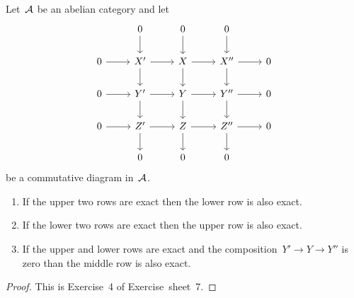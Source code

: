 \begin{lemma}[9-Lemma]
  \label{9 lemma}
  Let~$\mathcal{A}$ be an abelian category and let
  \[
    \begin{tikzcd}
        {}
      & 0
        \arrow{d}
      & 0
        \arrow{d}
      & 0
        \arrow{d}
      & {}
      \\
        0
        \arrow{r}
      & X'
        \arrow{r}
        \arrow{d}
      & X
        \arrow{r}
        \arrow{d}
      & X''
        \arrow{r}
        \arrow{d}
      & 0
      \\
        0
        \arrow{r}
      & Y'
        \arrow{r}
        \arrow{d}
      & Y
        \arrow{r}
        \arrow{d}
      & Y''
        \arrow{r}
        \arrow{d}
      & 0
      \\
        0
        \arrow{r}
      & Z'
        \arrow{r}
        \arrow{d}
      & Z
        \arrow{r}
        \arrow{d}
      & Z''
        \arrow{r}
        \arrow{d}
      & 0
      \\
        {}
      & 0
      & 0
      & 0
      & {}
    \end{tikzcd}
  \]
  be a commutative diagram in~$\mathcal{A}$.
  \begin{enumerate}
    \item
      If the upper two rows are exact then the lower row is also exact.
    \item
      If the lower two rows are exact then the upper row is also exact.
    \item
      If the upper and lower rows are exact and the composition~$Y' \to Y \to Y''$ is zero than the middle row is also exact.
  \end{enumerate}
\end{lemma}


\begin{proof}
  This is Exercise~4 of Exercise~sheet~7.
\end{proof}






